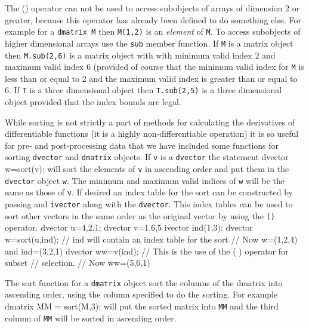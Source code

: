 The  () operator can not be used to access subobjects of
arrays of dimension 2 or greater, because this operator has
already been defined to do something else. For example
for a {\tt dmatrix M} then {\tt M(1,2)} is an {\it element}
of {\tt M}.  To access subobjects of higher dimensional arrays
use the {\tt sub} member function. If {\tt M} is a matrix object
then {\tt M.sub(2,6)} is a matrix object with with minimum valid
index 2 and maximum valid index 6 (provided of course that the
minimum valid index for {\tt M} is less than or equal to 2 and
the maximum valid index is greater than or equal to 6.
If {\tt T} is a three dimensional object then
{\tt T.sub(2,5)} is a three dimensional object provided that
the index bounds are legal. 




While sorting is not strictly a part of methods for calculating the
derivatives of differentiable functions (it is a highly non-differentiable
operation) it is so useful for pre- and post-processing data that we
have included some functions for sorting {\tt dvector} and {\tt dmatrix}
objects. If {\tt v} is a {\tt dvector} the statement
\beginexample
dvector w=sort(v);
\endexample
\noindent will sort the elements of {\tt v} in ascending order and 
put them in the {\tt dvector} object {\tt w}. The minimum and
maximum valid indices of {\tt w} will be the same as those of {\tt v}.
If desired an index table for the sort can be constructed by passing
and {\tt ivector} along with the {\tt dvector}. This index tables can be
used to sort other vectors in the same order as the original vector
by using the {\tt ()} operator.
\beginexample
dvector u={4,2,1};
dvector v={1,6,5}
ivector ind(1,3);
dvector w=sort(u,ind); // ind will contain an index table for the sort
// Now w=(1,2,4) and ind=(3,2,1)
dvector ww=v(ind);     // This is the use of the ( ) operator for subset
                       // selection. 
// Now ww=(5,6,1)
\endexample

The sort function for a {\tt dmatrix} object sort the columns of the
dmatrix into ascending order, using the column specified to do the
sorting. For example
\beginexample
dmatrix MM = sort(M,3);
\endexample
\noindent will put the sorted matrix into {\tt MM} and the third column of
{\tt MM} will be sorted in ascending order.

